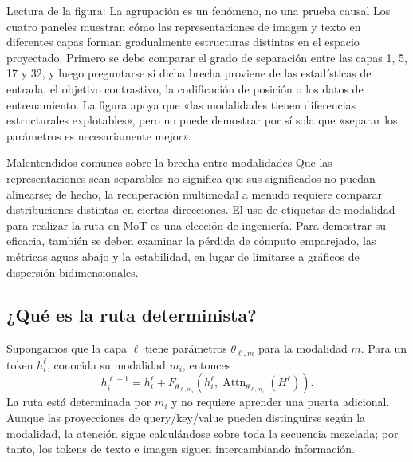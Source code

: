 \begin{knowledgebox}{Lectura de la figura: La agrupación es un fenómeno, no una prueba causal}
Los cuatro paneles muestran cómo las representaciones de imagen y texto en diferentes capas forman gradualmente estructuras distintas en el espacio proyectado. Primero se debe comparar el grado de separación entre las capas 1, 5, 17 y 32, y luego preguntarse si dicha brecha proviene de las estadísticas de entrada, el objetivo contrastivo, la codificación de posición o los datos de entrenamiento. La figura apoya que «las modalidades tienen diferencias estructurales explotables», pero no puede demostrar por sí sola que «separar los parámetros es necesariamente mejor».
\end{knowledgebox}

\begin{warningbox}{Malentendidos comunes sobre la brecha entre modalidades}
Que las representaciones sean separables no significa que sus significados no puedan alinearse; de hecho, la recuperación multimodal a menudo requiere comparar distribuciones distintas en ciertas direcciones. El uso de etiquetas de modalidad para realizar la ruta en MoT es una elección de ingeniería. Para demostrar su eficacia, también se deben examinar la pérdida de cómputo emparejado, las métricas aguas abajo y la estabilidad, en lugar de limitarse a gráficos de dispersión bidimensionales.
\end{warningbox}

\subsection{¿Qué es la ruta determinista?}

Supongamos que la capa $\ell$ tiene parámetros $\theta_{\ell,m}$ para la modalidad $m$. Para un token $h_i^\ell$, conocida su modalidad $m_i$, entonces
$$
h_i^{\ell+1}
=h_i^\ell+F_{\theta_{\ell,m_i}}
\left(h_i^\ell,\operatorname{Attn}_{\theta_{\ell,m_i}}(H^\ell)\right).
$$
La ruta está determinada por $m_i$ y no requiere aprender una puerta adicional. Aunque las proyecciones de query/key/value pueden distinguirse según la modalidad, la atención sigue calculándose sobre toda la secuencia mezclada; por tanto, los tokens de texto e imagen siguen intercambiando información.


